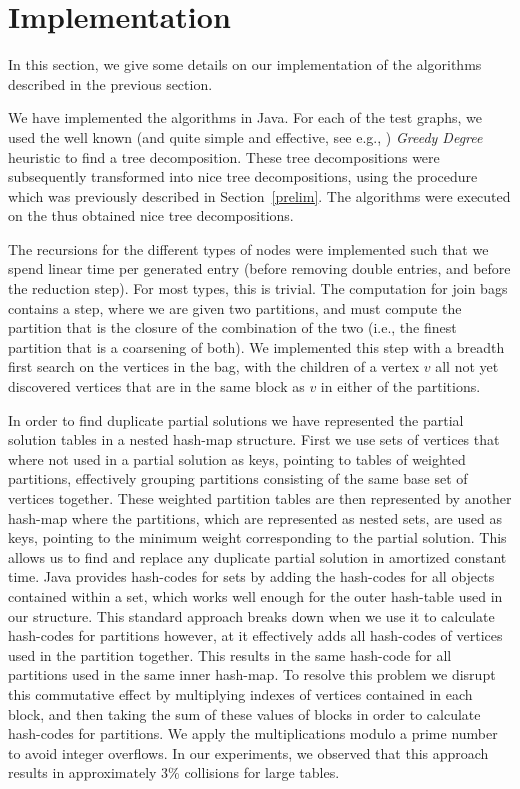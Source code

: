 \documentclass{llncs}
\begin{document}
\section{Implementation}
\label{section:experiments}
In this section, we give some details on our implementation of the algorithms described in the previous section.

We have implemented the algorithms in Java. For each of the test graphs, we used the well known (and quite simple and effective, see e.g., \cite{BodlaenderK10}) {\em Greedy Degree} 
heuristic to find a tree decomposition. These tree decompositions were subsequently transformed into nice tree decompositions,
using the procedure which was previously described in Section~\ref{prelim}. The algorithms were executed on the thus obtained nice tree decompositions.

The recursions for the different types of nodes were implemented such that we spend linear time per generated entry (before removing double entries, and before
the reduction step). For most types, this is trivial. The computation for join bags contains a step, where we are given two partitions, and must compute
the partition that is the closure of the combination of the two (i.e., the finest partition that is a coarsening of both). We implemented this step with a
breadth first search on the vertices in the bag, with the children of a vertex $v$ all not yet discovered vertices that are in the same block as $v$ in either of the
partitions.

In order to find duplicate partial solutions we have represented the partial solution tables in a nested hash-map structure.
First we use sets of vertices that where not used in a partial solution as keys, pointing to tables of weighted partitions, effectively grouping partitions consisting of the same base set of vertices together.
These weighted partition tables are then represented by another hash-map where the partitions, which are represented as nested sets, are used as keys, pointing to the minimum weight corresponding to the partial solution. This allows us to find and replace any duplicate partial solution in amortized constant time. Java provides hash-codes for sets by adding the hash-codes for all objects contained within a set, which works well enough for the outer hash-table used in our structure. This standard approach breaks down when we use it to calculate hash-codes for partitions however, at it effectively adds all hash-codes of vertices used in the partition together. This results in the same hash-code for all partitions used in the same inner hash-map. 
To resolve this problem we disrupt this commutative effect by multiplying indexes of vertices contained in each block, and then taking the sum of these values of
blocks in order to calculate hash-codes for partitions. We apply the multiplications modulo a prime number to avoid integer overflows.
In our experiments, we observed that this approach results in approximately 3\% collisions for large tables.
\end{document}
